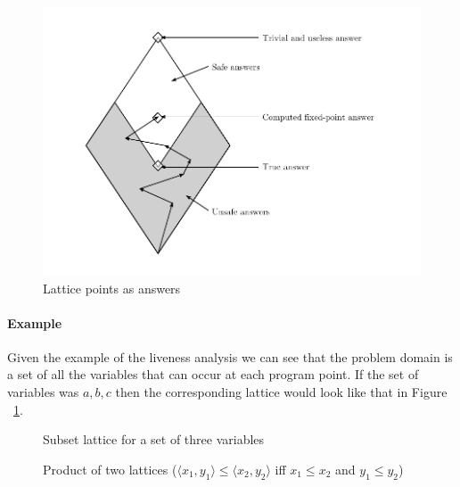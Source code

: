 
\begin{figure}
\begin{center}
\includegraphics[scale=0.85]{LatticeAnswers.pdf}
\caption{Lattice points as answers \citep{Schwartzbach2009}}
\end{center}
\end{figure}

\paragraph{Example} Given the example of the liveness analysis we can see that the problem domain is a set of all the variables that can occur at each program point. If the set of variables was ${a, b, c}$ then the corresponding lattice would look like that in Figure ~\ref{fig:livenessLattice}.

\begin{figure}
\begin{center}
\caption{Subset lattice for a set of three variables}
\label{fig:livenessLattice}
\end{center}
\end{figure}

\begin{figure}
\begin{center}
\caption{Product of two lattices ($\langle x_1, y_1 \rangle \leq \langle x_2, y_2 \rangle$ iff $x_1 \leq x_2$ and $y_1 \leq y_2$)}
\label{fig:latticeTuples}
\end{center}
\end{figure}

